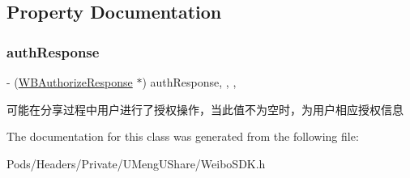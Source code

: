 \subsection{Property Documentation}
\mbox{\label{interface_w_b_share_message_to_contact_response_a896701421a502274b0ebdea976f90c13}} 
\subsubsection{\texorpdfstring{auth\+Response}{authResponse}}
{\footnotesize\ttfamily -\/ (\mbox{\hyperlink{interface_w_b_authorize_response}{W\+B\+Authorize\+Response}} $\ast$) auth\+Response\hspace{0.3cm}{\ttfamily [read]}, {\ttfamily [write]}, {\ttfamily [nonatomic]}, {\ttfamily [strong]}}

可能在分享过程中用户进行了授权操作，当此值不为空时，为用户相应授权信息 

The documentation for this class was generated from the following file\+:\begin{DoxyCompactItemize}
\item 
Pods/\+Headers/\+Private/\+U\+Meng\+U\+Share/Weibo\+S\+D\+K.\+h\end{DoxyCompactItemize}
